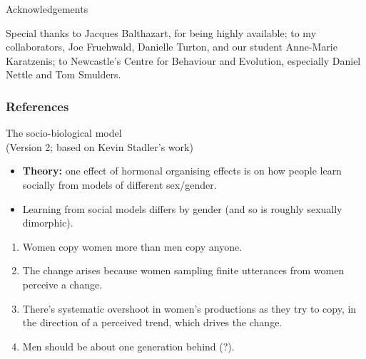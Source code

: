 \documentclass[hyperref={pdfpagelabels=false}]{beamer}
\begin{document}
\begin{frame}{Acknowledgements}
\begin{center}

Special thanks to Jacques Balthazart, for being highly available; to my collaborators, Joe Fruehwald, Danielle Turton, and our student Anne-Marie Karatzenis; to Newcastle's Centre for Behaviour and Evolution, especially Daniel Nettle and Tom Smulders.

\end{center}
\end{frame}



\begin{frame}[allowframebreaks]
\frametitle{References}
\newcommand*{\newblock}{natbib}


\end{frame}

\begin{frame}{The socio-biological model \\\small{(Version 2; based on Kevin Stadler's work)}}
	\begin{itemize}
	\item \textbf{Theory:} one effect of hormonal organising effects is on how people learn socially from models of different sex/gender.
	\item Learning from social models differs by gender (and so is roughly sexually dimorphic).
	\end{itemize}
	\begin{enumerate}
	\item Women copy women more than men copy anyone.
	\item The change arises because women sampling finite utterances from women perceive a change.
	\item There's systematic overshoot in women's productions as they try to copy, in the direction of a perceived trend, which drives the change.
	\item Men should be about one generation behind (?).
	\end{enumerate}

\end{frame}
\end{document}
